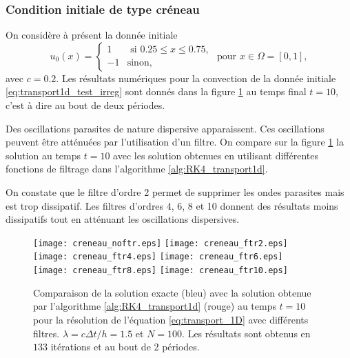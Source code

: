 \subsubsection{Condition initiale de type créneau}

On considère à présent la donnée initiale
\begin{equation}
u_0(x) = \left\lbrace
\begin{array}{rl}
1 & \text{ si } 0.25 \leq x \leq 0.75, \\
-1 & \text{sinon,}
\end{array}
\right.
\text{ pour } x \in \Omega = [0,1],
\label{eq:transport1d_test_irreg}
\end{equation}
avec $c=0.2$. Les résultats numériques pour la convection de la donnée initiale \eqref{eq:transport1d_test_irreg} sont donnés dans la figure \ref{fig:comp_ireg} au temps final $t=10$, c'est à dire au bout de deux périodes.

Des oscillations parasites de nature dispersive apparaissent. Ces oscillations peuvent être atténuées par l'utilisation d'un filtre. On compare sur la figure \ref{fig:comp_ireg} la solution au temps $t=10$ avec les solution obtenues en utilisant différentes fonctions de filtrage dans l'algorithme \ref{alg:RK4_transport1d}.

On constate que le filtre d'ordre 2 permet de supprimer les ondes parasites mais est trop dissipatif. Les filtres d'ordres 4, 6, 8 et 10 donnent des résultats moins dissipatifs tout en atténuant les oscillations dispersives.

\begin{figure}[htbp]
\begin{center}
\texttt{[image: creneau\_noftr.eps]}
\texttt{[image: creneau\_ftr2.eps]}\\
\texttt{[image: creneau\_ftr4.eps]}
\texttt{[image: creneau\_ftr6.eps]}\\
\texttt{[image: creneau\_ftr8.eps]}
\texttt{[image: creneau\_ftr10.eps]}\\
\end{center}
\caption{Comparaison de la solution exacte (bleu) avec la solution obtenue par l'algorithme \ref{alg:RK4_transport1d} (rouge) au temps $t=10$ pour la résolution de l'équation \eqref{eq:transport_1D} avec différents filtres. $\lambda = c \Delta t / h = 1.5$ et $N=100$. Les résultats sont obtenus en $133$ itérations et au bout de 2 périodes.}
\label{fig:comp_ireg}
\end{figure}

